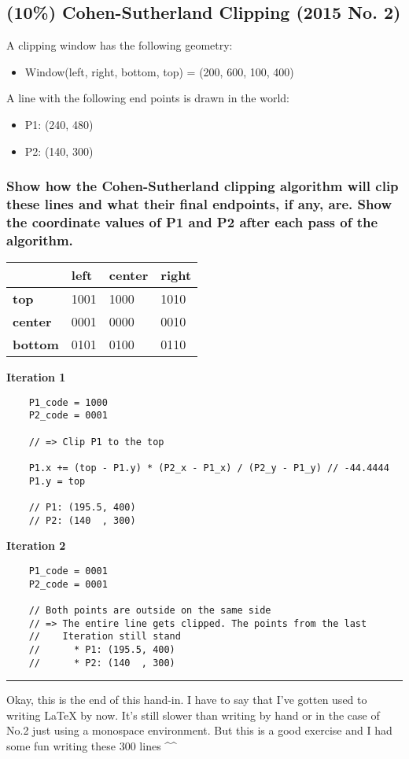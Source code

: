 \subsection{(10\%) Cohen-Sutherland Clipping (2015 No. 2)}
A clipping window has the following geometry:
\begin{itemize}
    \item Window(left, right, bottom, top) = (200, 600, 100, 400) 
\end{itemize}
 
A line with the following end points is drawn in the world: 
\begin{itemize}
    \item P1: (240, 480) 
    \item P2: (140, 300) 
\end{itemize}
 
\subsubsection{Show how the Cohen-Sutherland clipping algorithm will clip these lines and what their final endpoints, if any, are.  Show the coordinate values of P1 and P2 after each pass of the algorithm.}

\begin{tabular}{|l|l|l|l|}
    \hline
    & \textbf{left} & \textbf{center} & \textbf{right} \\   \hline
    \textbf{top}    & 1001 & 1000   & 1010 \\    \hline
    \textbf{center} & 0001 & 0000   & 0010 \\    \hline
    \textbf{bottom} & 0101 & 0100   & 0110 \\    \hline
\end{tabular}

\textbf{Iteration 1}

\begin{verbatim}
    P1_code = 1000
    P2_code = 0001
    
    // => Clip P1 to the top

    P1.x += (top - P1.y) * (P2_x - P1_x) / (P2_y - P1_y) // -44.4444
    P1.y = top

    // P1: (195.5, 400)
    // P2: (140  , 300)
\end{verbatim}

\textbf{Iteration 2}

\begin{verbatim}
    P1_code = 0001
    P2_code = 0001

    // Both points are outside on the same side
    // => The entire line gets clipped. The points from the last
    //    Iteration still stand
    //      * P1: (195.5, 400)
    //      * P2: (140  , 300)

\end{verbatim}

\rule{\textwidth}{0.25mm}
Okay, this is the end of this hand-in. I have to say that I've gotten used to writing \LaTeX{} by now. It's still slower than writing by hand or in the case of No.2 just using a monospace environment. But this is a good exercise and I had some fun writing these 300 lines \string^\string^